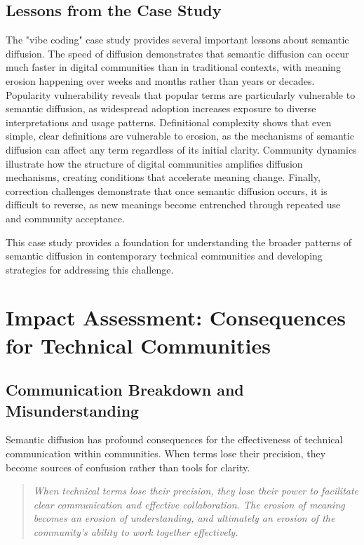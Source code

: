 \documentclass[11pt]{article}
\begin{document}
\subsection{Lessons from the Case Study}

The "vibe coding" case study provides several important lessons about semantic diffusion. The speed of diffusion demonstrates that semantic diffusion can occur much faster in digital communities than in traditional contexts, with meaning erosion happening over weeks and months rather than years or decades. Popularity vulnerability reveals that popular terms are particularly vulnerable to semantic diffusion, as widespread adoption increases exposure to diverse interpretations and usage patterns. Definitional complexity shows that even simple, clear definitions are vulnerable to erosion, as the mechanisms of semantic diffusion can affect any term regardless of its initial clarity. Community dynamics illustrate how the structure of digital communities amplifies diffusion mechanisms, creating conditions that accelerate meaning change. Finally, correction challenges demonstrate that once semantic diffusion occurs, it is difficult to reverse, as new meanings become entrenched through repeated use and community acceptance.

This case study provides a foundation for understanding the broader patterns of semantic diffusion in contemporary technical communities and developing strategies for addressing this challenge.

\section{Impact Assessment: Consequences for Technical Communities}

\subsection{Communication Breakdown and Misunderstanding}

Semantic diffusion has profound consequences for the effectiveness of technical communication within communities. When terms lose their precision, they become sources of confusion rather than tools for clarity.

\begin{quote}
\emph{When technical terms lose their precision, they lose their power to facilitate clear communication and effective collaboration. The erosion of meaning becomes an erosion of understanding, and ultimately an erosion of the community's ability to work together effectively.}
\end{quote}
\end{document}
